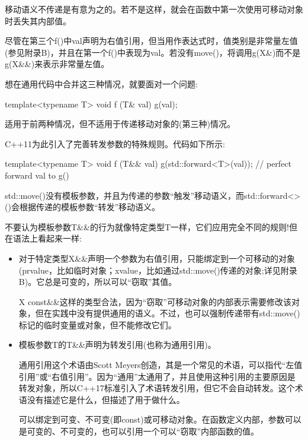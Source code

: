 \begin{notice}移动语义不传递是有意为之的。若不是这样，就会在函数中第一次使用可移动对象时丢失其内部值。
\end{notice}

尽管在第三个f()中val声明为右值引用，但当用作表达式时，值类别是非常量左值(参见附录B)，并且在第一个f()中表现为val。若没有move()，将调用g(X\&)而不是g(X\&\&)来表示非常量左值。

想在通用代码中合并这三种情况，就要面对一个问题:

\begin{cpp}
template<typename T>
void f (T& val) {
	g(val);
}
\end{cpp}

适用于前两种情况，但不适用于传递移动对象的(第三种)情况。

C++11为此引入了完善转发参数的特殊规则。代码如下所示:

\begin{cpp}
template<typename T>
void f (T&& val) {
	g(std::forward<T>(val)); // perfect forward val to g()
}
\end{cpp}

std::move()没有模板参数，并且为传递的参数“触发”移动语义，而std::forward<>()会根据传递的模板参数“转发”移动语义。

不要认为模板参数T\&\&的行为就像特定类型T一样，它们应用完全不同的规则!但在语法上看起来一样:

\begin{itemize}
\item 
对于特定类型X\&\&声明一个参数为右值引用，只能绑定到一个可移动的对象(prvalue，比如临时对象；xvalue，比如通过std::move()传递的对象;详见附录B)。它总是可变的，所以可以“窃取”其值。

\begin{notice}X const\&\&这样的类型合法，因为“窃取”可移动对象的内部表示需要修改该对象，但在实践中没有提供通用的语义。不过，也可以强制传递带有std::move()标记的临时变量或对象，但不能修改它们。
\end{notice}

\item 
模板参数T的T\&\&声明为转发引用(也称为通用引用)。

\begin{notice}通用引用这个术语由Scott Meyers创造，其是一个常见的术语，可以指代“左值引用”或“右值引用”。因为“通用”太通用了，并且使用这种引用的主要原因是转发对象，所以C++17标准引入了术语转发引用，但它不会自动转发。这个术语没有描述它是什么，但描述了用于做什么。
\end{notice}

可以绑定到可变、不可变(即const)或可移动对象。在函数定义内部，参数可以是可变的、不可变的，也可以引用一个可以“窃取”内部函数的值。
\end{itemize}

